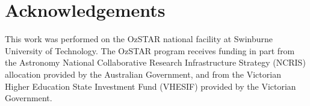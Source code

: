 \documentclass[12pt]{article}
\begin{document}
\newpage %

\section*{Acknowledgements}
\small
This work was performed on the OzSTAR national facility at Swinburne University of Technology.
The OzSTAR program receives funding in part from the Astronomy National Collaborative Research Infrastructure Strategy (NCRIS) allocation provided by the Australian Government, and from the Victorian Higher Education State Investment Fund (VHESIF) provided by the Victorian Government.




\end{document}
